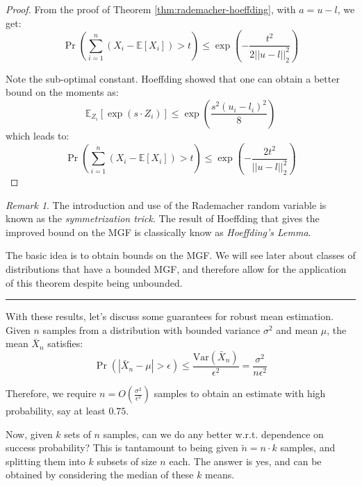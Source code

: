 \documentclass{article}
\theoremstyle{remark}
\newtheorem*{remark}{Remark}
\newcommand{\comprule}{\textcolor[RGB]{220,220,220}{\rule{\linewidth}{0.2pt}}}
\newcommand{\Exp}{\mathbb{E}}
\newcommand{\Var}{\mathrm{Var}}
\begin{document}
\begin{proof}
From the proof of Theorem \ref{thm:rademacher-hoeffding}, with \(a = u - l\), we get:
\begin{equation*}
\Pr\left(\sum_{i=1}^{n}(X_{i} - \Exp[X_{i}]) > t\right) \leq \exp\left(-\frac{t^{2}}{2||u - l||_{2}^{2}}\right)
\end{equation*}

Note the sub-optimal constant. Hoeffding showed that one can obtain a better bound on the moments as:
\begin{equation*}
\Exp_{Z_{i}}\left[\exp(s \cdot Z_{i})\right] \leq \exp\left(\frac{s^{2}(u_{i} - l_{i})^{2}}{8}\right)
\end{equation*}
which leads to:
\begin{equation*}
\Pr\left(\sum_{i=1}^{n}(X_{i} - \Exp[X_{i}]) > t\right) \leq \exp\left(-\frac{2t^{2}}{||u - l||_{2}^{2}}\right)
\end{equation*}

\end{proof}

\begin{remark}
The introduction and use of the Rademacher random variable is known as the \emph{symmetrization trick}. The result of Hoeffding that gives the improved bound on the MGF is classically know as \emph{Hoeffding's Lemma}.

The basic idea is to obtain bounds on the MGF. We will see later about classes of distributions that have a bounded MGF, and therefore allow for the application of this theorem despite being unbounded.
\end{remark}

\comprule

With these results, let's discuss some guarantees for robust mean estimation. Given \(n\) samples from a distribution with bounded variance \(\sigma^{2}\) and mean \(\mu\), the mean \(\bar{X}_{n}\) satisfies:
\begin{equation*}
\Pr\left(|\bar{X}_{n} - \mu| > \epsilon\right) \leq \frac{\Var(\bar{X}_{n})}{\epsilon^{2}} = \frac{\sigma^{2}}{n\epsilon^{2}}
\end{equation*}

Therefore, we require \(n = O\left(\frac{\sigma^{2}}{\epsilon^{2}}\right)\) samples to obtain an estimate with high probability, say at least \(0.75\).

Now, given \(k\) sets of \(n\) samples, can we do any better w.r.t. dependence on success probability? This is tantamount to being given \(\tilde{n} = n\cdot k\) samples, and splitting them into \(k\) subsets of size \(n\) each. The answer is yes, and can be obtained by considering the median of these \(k\) means.
\end{document}
